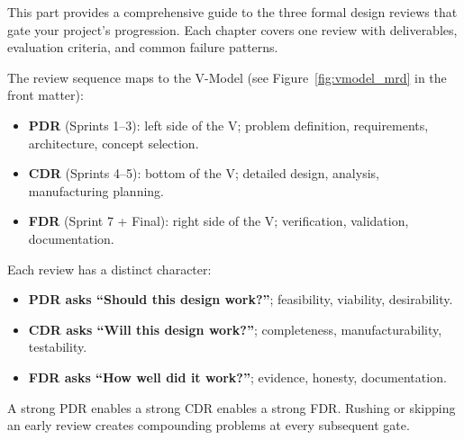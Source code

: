 \documentclass[11pt,letterpaper,twoside,openany]{book}
\begin{document}
This part provides a comprehensive guide to the three formal design reviews that gate your project's progression. Each chapter covers one review with deliverables, evaluation criteria, and common failure patterns.


The review sequence maps to the V-Model (see Figure~\ref{fig:vmodel_mrd} in the front matter):
\begin{itemize}[nosep,leftmargin=1.5em]
\item \textbf{PDR} (Sprints 1--3): left side of the V; problem definition, requirements, architecture, concept selection.
\item \textbf{CDR} (Sprints 4--5): bottom of the V; detailed design, analysis, manufacturing planning.
\item \textbf{FDR} (Sprint 7 + Final): right side of the V; verification, validation, documentation.
\end{itemize}

Each review has a distinct character:
\begin{itemize}[nosep,leftmargin=1.5em]
\item \textbf{PDR asks ``Should this design work?''}; feasibility, viability, desirability.
\item \textbf{CDR asks ``Will this design work?''}; completeness, manufacturability, testability.
\item \textbf{FDR asks ``How well did it work?''}; evidence, honesty, documentation.
\end{itemize}

A strong PDR enables a strong CDR enables a strong FDR. Rushing or skipping an early review creates compounding problems at every subsequent gate.
\end{document}
